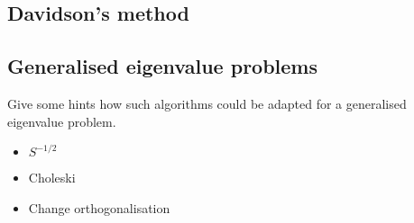 \subsection{Davidson's method}

\subsection{Generalised eigenvalue problems}
\label{sec:GeneralisedEigenvalueProblem}
Give some hints how such algorithms
could be adapted for a generalised eigenvalue problem.


\begin{itemize}
	\item $S^{-1/2}$
	\item Choleski
	\item Change orthogonalisation
\end{itemize}


